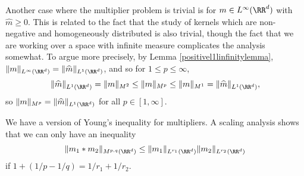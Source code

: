 Another case where the multiplier problem is trivial is for $m \in L^\infty(\RR^d)$ with $\widehat{m} \geq 0$. This is related to the fact that the study of kernels which are non-negative and homogeneously distributed is also trivial, though the fact that we are working over a space with infinite measure complicates the analysis somewhat. To argue more precisely, by Lemma \ref{positivel1linfinitylemma}, $\| m \|_{L^\infty(\RR^d)} = \| \widehat{m} \|_{L^1(\RR^d)}$, and so for $1 \leq p \leq \infty$,
%
\[ \| \widehat{m} \|_{L^1(\RR^d)} = \| m \|_{M^2} \leq \| m \|_{M^p} \leq \| m \|_{M^1} = \| \widehat{m} \|_{L^1(\RR^d)}, \]
%
so $\| m \|_{M^p} = \| \widehat{m} \|_{L^1(\RR^d)}$ for all $p \in [1,\infty]$.

We have a version of Young's inequality for multipliers. A scaling analysis shows that we can only have an inequality
%
\[ \| m_1 * m_2 \|_{M^{p,q}(\RR^d)} \leq \| m_1 \|_{L^{r_1}(\RR^d)} \| m_2 \|_{L^{r_2}(\RR^d)} \]
%
if $1 + (1/p - 1/q) = 1/r_1 + 1/r_2$.

